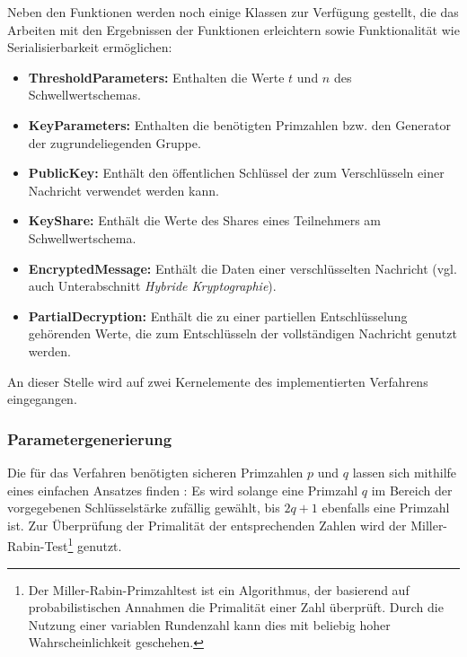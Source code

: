 Neben den Funktionen werden noch einige Klassen zur Verfügung gestellt, die das Arbeiten mit den Ergebnissen der Funktionen erleichtern sowie Funktionalität wie Serialisierbarkeit ermöglichen:

\begin{itemize}
  \item \textbf{ThresholdParameters: } Enthalten die Werte \(t\) und \(n\) des Schwellwertschemas.
  \item \textbf{KeyParameters: } Enthalten die benötigten Primzahlen bzw. den Generator der zugrundeliegenden Gruppe.
  \item \textbf{PublicKey: } Enthält den öffentlichen Schlüssel der zum Verschlüsseln einer Nachricht verwendet werden kann.
  \item \textbf{KeyShare: } Enthält die Werte des Shares eines Teilnehmers am Schwellwertschema.
  \item \textbf{EncryptedMessage: } Enthält die Daten einer verschlüsselten Nachricht (vgl. auch Unterabschnitt \textit{Hybride Kryptographie}).
  \item \textbf{PartialDecryption: } Enthält die zu einer partiellen Entschlüsselung gehörenden Werte, die zum Entschlüsseln der vollständigen Nachricht genutzt werden.
\end{itemize}

An dieser Stelle wird auf zwei Kernelemente des implementierten Verfahrens eingegangen.

\subsubsection{Parametergenerierung}
  
 \label{sec_impl_threshold_keyparams}
  


Die für das Verfahren benötigten sicheren Primzahlen \(p\) und \(q\) lassen sich mithilfe eines einfachen Ansatzes finden \cite{hoc1996}: Es wird solange eine Primzahl \(q\) im Bereich der vorgegebenen Schlüsselstärke zufällig gewählt, bis \(2q + 1\) ebenfalls eine Primzahl ist. Zur Überprüfung der Primalität der entsprechenden Zahlen wird der Miller-Rabin-Test\footnote{
  Der Miller-Rabin-Primzahltest ist ein Algorithmus, der basierend auf probabilistischen Annahmen die Primalität einer Zahl überprüft. Durch die Nutzung einer variablen Rundenzahl kann dies mit beliebig hoher Wahrscheinlichkeit geschehen.
} genutzt.

